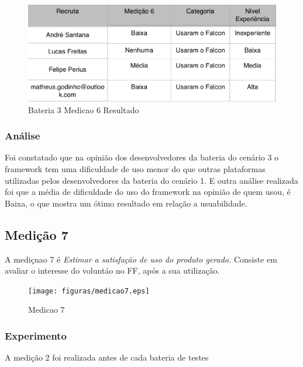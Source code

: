 
\begin{figure}[H]
  \centering
  \label{fig:indicadores}
  \includegraphics[keepaspectratio=true,scale=0.6]{figuras/Bateria3Medicao6.eps}
  \caption{Bateria 3 Medicao 6 Resultado}
\end{figure}


\subsubsection{Análise}

Foi constatado que na opinião dos desenvolvedores da bateria do cenário 3 o framework tem uma dificuldade de uso menor
do que outras plataformas utilizadas pelos desenvolvedores da bateria do cenário 1. E outra análise realizada
foi que a média de dificuldade do uso do framework na opinião de quem usou, é Baixa, o que mostra um ótimo resultado
em relação a usuabilidade.

\subsection{Medição 7}

A mediçnao 7 é \textit{Estimar a satisfação de uso do produto gerado.} Consiste em avaliar o interesse do voluntáo no FF, após
a sua utilização.

\begin{figure}[H]
  \centering
  \label{fig:indicadores}
  \texttt{[image: figuras/medicao7.eps]}
  \caption{Medicao 7}
\end{figure}

\subsubsection{Experimento}

A medição 2 foi realizada antes de cada bateria de testes



